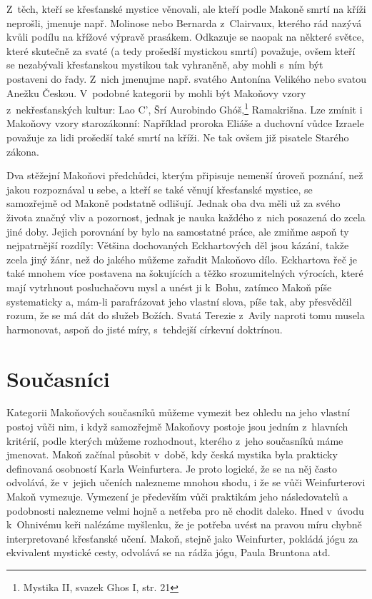 Z~těch, kteří se křesťanské mystice věnovali, ale kteří podle Makoně smrtí na
kříži neprošli, jmenuje např. Molinose nebo Bernarda z~Clairvaux, kterého rád
nazývá kvůli podílu na křížové výpravě prasákem. Odkazuje se naopak na některé
světce, které skutečně za svaté (a tedy prošedší mystickou smrtí) považuje, ovšem
kteří se nezabývali křesťanskou mystikou tak vyhraněně, aby mohli s~ním být
postaveni do řady. Z~nich jmenujme např. svatého Antonína
Velikého nebo svatou
Anežku Českou. V~podobné kategorii by mohli být Makoňovy vzory z~nekřesťanských
kultur: Lao C', Šrí Aurobindo Ghóš,\footnote{Mystika II,
svazek Ghos I, str. 21} Ramakrišna. Lze zmínit i Makoňovy vzory
starozákonní: Například proroka Eliáše a duchovní vůdce
Izraele považuje za lidi prošedší také smrtí na kříži. Ne tak ovšem již pisatele
Starého zákona.

Dva stěžejní Makoňovi předchůdci, kterým připisuje nemenší úroveň poznání, než jakou
rozpoznával u sebe, a kteří se také věnují křesťanské mystice, se samozřejmě od
Makoně podstatně odlišují. Jednak oba dva měli už za svého života značný vliv a
pozornost,\cite{hackett2012companion}\cite{britannicaTeresa} jednak je nauka každého z~nich posazená do zcela jiné doby. Jejich
porovnání by bylo na samostatné práce, ale zmiňme aspoň ty nejpatrnější rozdíly:
Většina dochovaných Eckhartových děl jsou kázání, takže zcela jiný žánr, než do
jakého můžeme zařadit Makoňovo dílo. Eckhartova řeč je také mnohem více
postavena na šokujících a těžko srozumitelných výrocích, které mají vytrhnout
posluchačovu mysl a unést ji k~Bohu,\cite{landauer1978eckhart} zatímco Makoň píše systematicky a, mám-li
parafrázovat jeho vlastní slova, píše tak, aby přesvědčil rozum, že se má dát do služeb
Božích. Svatá Terezie z~Avily naproti tomu musela harmonovat, aspoň do jisté
míry, s~tehdejší církevní doktrínou.\cite{eire2019life}

\section{Současníci}

Kategorii Makoňových současníků můžeme vymezit bez ohledu na jeho vlastní postoj
vůči nim, i když samozřejmě Makoňovy postoje jsou jedním z~hlavních kritérií,
podle kterých můžeme rozhodnout, kterého z~jeho současníků máme jmenovat. Makoň
začínal působit v~době, kdy česká mystika byla prakticky definovaná osobností
Karla Weinfurtera.\cite{sanitrak2006dejiny1} Je proto logické, že se na něj
často odvolává, že v~jejich učeních nalezneme mnohou shodu, i že se vůči
Weinfurterovi Makoň vymezuje. Vymezení je především vůči praktikám jeho
následovatelů a podobnosti nalezneme velmi hojně a netřeba pro ně chodit
daleko. Hned v~úvodu k~Ohnivému keři\cite{weinfurter1923ohnivy} nalézáme
myšlenku, že je potřeba uvést na pravou míru chybně interpretované křesťanské
učení. Makoň, stejně jako Weinfurter, pokládá jógu za ekvivalent mystické cesty,
odvolává se na rádža jógu, Paula Bruntona atd.

